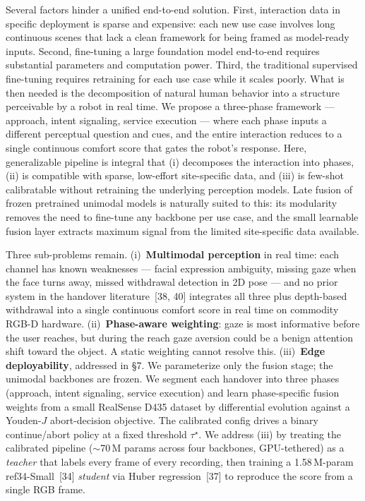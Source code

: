 \documentclass{article}
\begin{document}
Several factors hinder a unified end-to-end solution. First, interaction data in specific deployment is sparse and expensive: each new use case involves long continuous scenes that lack a clean framework for being framed as model-ready inputs. Second, fine-tuning a large foundation model end-to-end requires substantial parameters and computation power. Third, the traditional supervised fine-tuning requires retraining for each use case while it scales poorly. What is then needed is the decomposition of natural human behavior into a structure perceivable by a robot in real time. We propose a three-phase framework --- approach, intent signaling, service execution --- where each phase inputs a different perceptual question and cues, and the entire interaction reduces to a single continuous comfort score that gates the robot's response. Here, generalizable pipeline is integral that (i) decomposes the interaction into phases, (ii) is compatible with sparse, low-effort site-specific data, and (iii) is few-shot calibratable without retraining the underlying perception models. Late fusion of frozen pretrained unimodal models is naturally suited to this: its modularity removes the need to fine-tune any backbone per use case, and the small learnable fusion layer extracts maximum signal from the limited site-specific data available.

Three sub-problems remain. (i)~\textbf{Multimodal perception} in real time: each channel has known weaknesses --- facial expression ambiguity, missing gaze when the face turns away, missed withdrawal detection in 2D pose --- and no prior system in the handover literature~[38, 40] integrates all three plus depth-based withdrawal into a single continuous comfort score in real time on commodity RGB-D hardware. (ii)~\textbf{Phase-aware weighting}: gaze is most informative before the user reaches, but during the reach gaze aversion could be a benign attention shift toward the object. A static weighting cannot resolve this. (iii)~\textbf{Edge deployability}, addressed in \S7. We parameterize only the fusion stage; the unimodal backbones are frozen. We segment each handover into three phases (approach, intent signaling, service execution) and learn phase-specific fusion weights from a small RealSense D435 dataset by differential evolution against a Youden-$J$ abort-decision objective. The calibrated config drives a binary continue/abort policy at a fixed threshold $\tau^\star$. We address (iii) by treating the calibrated pipeline ($\sim$70\,M params across four backbones, GPU-tethered) as a \emph{teacher} that labels every frame of every recording, then training a 1.58\,M-param ref34-Small~[34] \emph{student} via Huber regression~[37] to reproduce the score from a single RGB frame.
\end{document}

